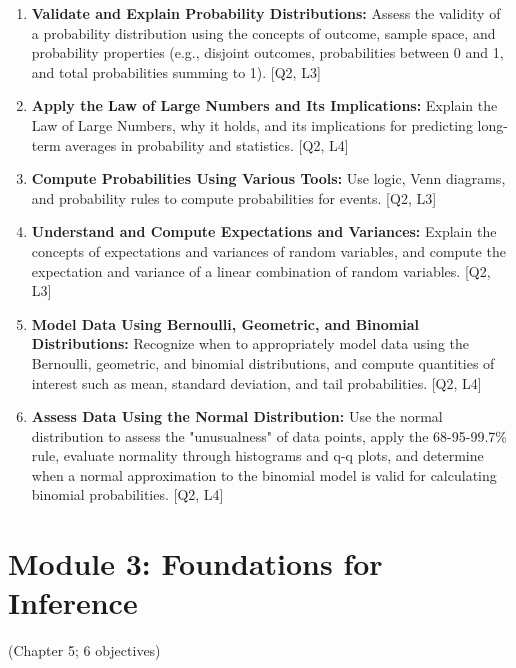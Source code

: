 \documentclass[12pt]{article}
\begin{document}
\begin{enumerate}
    \item \textbf{Validate and Explain Probability Distributions:} Assess the validity of a probability distribution using the concepts of outcome, sample space, and probability properties (e.g., disjoint outcomes, probabilities between 0 and 1, and total probabilities summing to 1). [Q2, L3]
    \item \textbf{Apply the Law of Large Numbers and Its Implications:} Explain the Law of Large Numbers, why it holds, and its implications for predicting long-term averages in probability and statistics. [Q2, L4]
    \item \textbf{Compute Probabilities Using Various Tools:} Use logic, Venn diagrams, and probability rules to compute probabilities for events. [Q2, L3]
    \item \textbf{Understand and Compute Expectations and Variances:} Explain the concepts of expectations and variances of random variables, and compute the expectation and variance of a linear combination of random variables. [Q2, L3] 
    \item \textbf{Model Data Using Bernoulli, Geometric, and Binomial Distributions:} Recognize when to appropriately model data using the Bernoulli, geometric, and binomial distributions, and compute quantities of interest such as mean, standard deviation, and tail probabilities. [Q2, L4]
    \item \textbf{Assess Data Using the Normal Distribution:} Use the normal distribution to assess the "unusualness" of data points, apply the 68-95-99.7\% rule, evaluate normality through histograms and q-q plots, and determine when a normal approximation to the binomial model is valid for calculating binomial probabilities. [Q2, L4]
\end{enumerate}

\newpage


\section{Module 3: Foundations for Inference}
(Chapter 5; 6 objectives)

\end{document}
